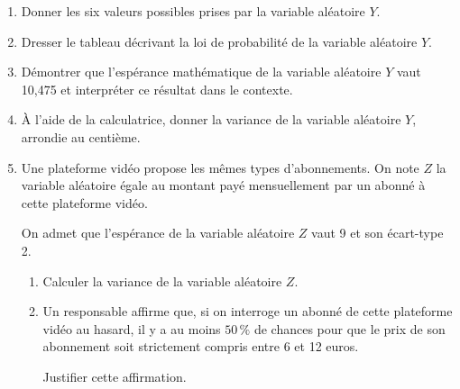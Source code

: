 \begin{enumerate}
\item Donner les six valeurs possibles prises par la variable aléatoire $Y$.
\item Dresser le tableau décrivant la loi de probabilité de la variable aléatoire $Y$.
\item Démontrer que l'espérance mathématique de la variable aléatoire $Y$ vaut 10,475 et interpréter ce résultat dans le contexte.
\item À l'aide de la calculatrice, donner la variance de la variable aléatoire $Y$, arrondie au centième.
\item Une plateforme vidéo propose les mêmes types d'abonnements. On note $Z$ la variable aléatoire égale au montant payé mensuellement par un abonné à cette plateforme vidéo.

On admet que l'espérance de la variable aléatoire $Z$ vaut 9 et son écart-type 2.
	\begin{enumerate}
		\item Calculer la variance de la variable aléatoire $Z$.
		\item Un responsable affirme que, si on interroge un abonné de cette plateforme vidéo au hasard, il y a au moins $50\,\%$ de chances pour que le prix de son abonnement soit strictement compris entre 6 et 12 euros.

		Justifier cette affirmation.
	\end{enumerate}
	\end{enumerate}
